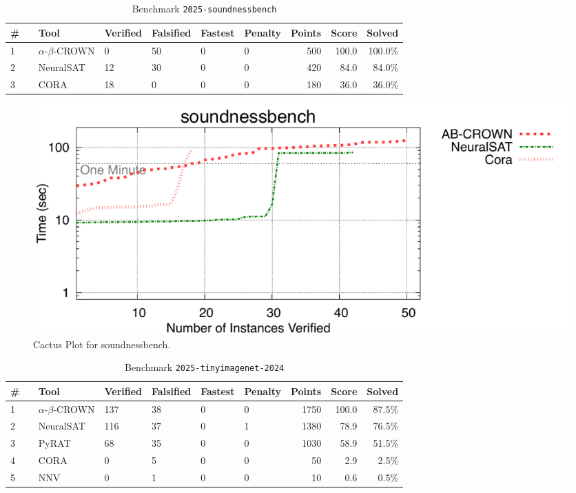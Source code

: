 \begin{table}[h]
\begin{center}
\caption{Benchmark \texttt{2025-soundnessbench}} \label{tab:cat_2025_soundnessbench}
{\setlength{\tabcolsep}{2pt}
\begin{tabular}[h]{@{}llllllrrr@{}}
\toprule
\textbf{\# ~} & \textbf{Tool} & \textbf{Verified} & \textbf{Falsified} & \textbf{Fastest} & \textbf{Penalty} & \textbf{Points} & \textbf{Score} & \textbf{Solved}\\
\midrule
1 & $\alpha$-$\beta$-CROWN & 0 & 50 & 0 & 0 & 500 & 100.0 & 100.0\% \\
2 & NeuralSAT & 12 & 30 & 0 & 0 & 420 & 84.0 & 84.0\% \\
3 & CORA & 18 & 0 & 0 & 0 & 180 & 36.0 & 36.0\% \\
\bottomrule
\end{tabular}
}
\end{center}
\end{table}



\begin{figure}[h]
\centerline{\includegraphics[width=\textwidth]{cactus/2025_soundnessbench.pdf}}
\caption{Cactus Plot for soundnessbench.}
\label{fig:quantPic}
\end{figure}


\clearpage

\begin{table}[h]
\begin{center}
\caption{Benchmark \texttt{2025-tinyimagenet-2024}} \label{tab:cat_2025_tinyimagenet_2024}
{\setlength{\tabcolsep}{2pt}
\begin{tabular}[h]{@{}llllllrrr@{}}
\toprule
\textbf{\# ~} & \textbf{Tool} & \textbf{Verified} & \textbf{Falsified} & \textbf{Fastest} & \textbf{Penalty} & \textbf{Points} & \textbf{Score} & \textbf{Solved}\\
\midrule
1 & $\alpha$-$\beta$-CROWN & 137 & 38 & 0 & 0 & 1750 & 100.0 & 87.5\% \\
2 & NeuralSAT & 116 & 37 & 0 & 1 & 1380 & 78.9 & 76.5\% \\
3 & PyRAT & 68 & 35 & 0 & 0 & 1030 & 58.9 & 51.5\% \\
4 & CORA & 0 & 5 & 0 & 0 & 50 & 2.9 & 2.5\% \\
5 & NNV & 0 & 1 & 0 & 0 & 10 & 0.6 & 0.5\% \\
\bottomrule
\end{tabular}
}
\end{center}
\end{table}




